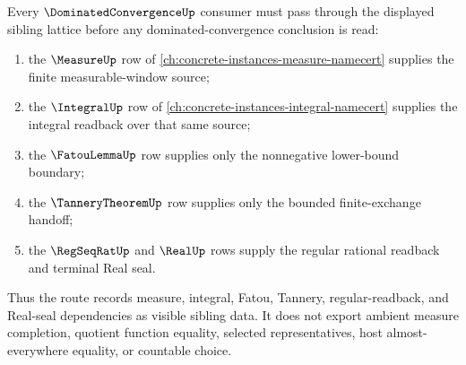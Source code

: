 \begin{theorem}\label{thm:dominated-convergence-measure-integral-lattice-link}
Every $\DominatedConvergenceUp$ consumer must pass through the displayed sibling lattice before any dominated-convergence conclusion is read:
\begin{enumerate}
\item the $\MeasureUp$ row of \autoref{ch:concrete-instances-measure-namecert} supplies the finite measurable-window source;
\item the $\IntegralUp$ row of \autoref{ch:concrete-instances-integral-namecert} supplies the integral readback over that same source;
\item the $\FatouLemmaUp$ row supplies only the nonnegative lower-bound boundary;
\item the $\TanneryTheoremUp$ row supplies only the bounded finite-exchange handoff;
\item the $\RegSeqRatUp$ and $\RealUp$ rows supply the regular rational readback and terminal Real seal.
\end{enumerate}
Thus the route records measure, integral, Fatou, Tannery, regular-readback, and Real-seal dependencies as visible sibling data. It does not export ambient measure completion, quotient function equality, selected representatives, host almost-everywhere equality, or countable choice.
\end{theorem}
